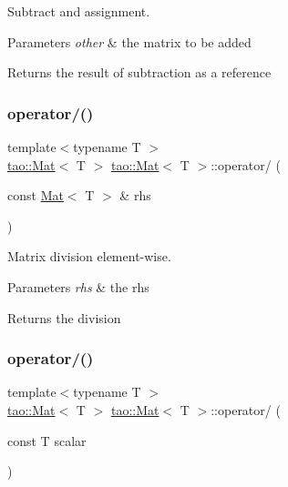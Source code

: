 Subtract and assignment. 


\begin{DoxyParams}{Parameters}
{\em other} & the matrix to be added \\
\hline
\end{DoxyParams}
\begin{DoxyReturn}{Returns}
the result of subtraction as a reference 
\end{DoxyReturn}
\mbox{\label{classtao_1_1_mat_a0f550cb7daaaf75abe46f3cda97f7df9}} 
\subsubsection{\texorpdfstring{operator/()}{operator/()}\hspace{0.1cm}{\footnotesize\ttfamily [1/2]}}
{\footnotesize\ttfamily template$<$typename T $>$ \\
\mbox{\hyperlink{classtao_1_1_mat}{tao\+::\+Mat}}$<$ T $>$ \mbox{\hyperlink{classtao_1_1_mat}{tao\+::\+Mat}}$<$ T $>$\+::operator/ (\begin{DoxyParamCaption}\item[{const \mbox{\hyperlink{classtao_1_1_mat}{Mat}}$<$ T $>$ \&}]{rhs }\end{DoxyParamCaption})}



Matrix division element-\/wise. 


\begin{DoxyParams}{Parameters}
{\em rhs} & the rhs \\
\hline
\end{DoxyParams}
\begin{DoxyReturn}{Returns}
the division 
\end{DoxyReturn}
\mbox{\label{classtao_1_1_mat_a3dde01988a0bb663e5fbeae1d509eb0c}} 
\subsubsection{\texorpdfstring{operator/()}{operator/()}\hspace{0.1cm}{\footnotesize\ttfamily [2/2]}}
{\footnotesize\ttfamily template$<$typename T $>$ \\
\mbox{\hyperlink{classtao_1_1_mat}{tao\+::\+Mat}}$<$ T $>$ \mbox{\hyperlink{classtao_1_1_mat}{tao\+::\+Mat}}$<$ T $>$\+::operator/ (\begin{DoxyParamCaption}\item[{const T}]{scalar }\end{DoxyParamCaption})}



